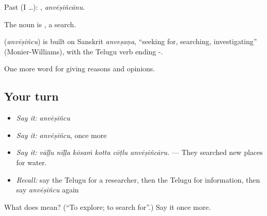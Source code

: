 Past (I …): , \emph{anvēṣiñcānu}.

The noun is , a search.

\begin{cousinweb}
\textbf{} (\emph{anvēṣiñcu}) is built on Sanskrit \emph{anveṣaṇa}, \textquotedblleft{}seeking for, searching, investigating\textquotedblright{} (Monier-Williams), with the Telugu verb ending -.
\end{cousinweb}

\begin{grammarlens}[title={What you've built}]
One more word for giving reasons and opinions.
\end{grammarlens}

\subsection*{Your turn}
\begin{itemize}
\raggedright
  \item \emph{Say it:} \emph{anvēṣiñcu}
  \item \emph{Say it:} \emph{anvēṣiñcu}, once more
  \item \emph{Say it:} \emph{vāḷḷu nīḷḷa kōsaṁ kotta cōṭlu anvēṣiñcāru.} — They searched new places for water.
  \item \emph{Recall:} say the Telugu for a researcher, then the Telugu for information, then say \emph{anvēṣiñcu} again
\end{itemize}

\begin{tcolorbox}[breakable,colback=teal!4,colframe=teal!35!black,title={Before you move on}]
What does  mean? (\textquotedblleft{}To explore; to search for\textquotedblright{}.) Say it once more.
\end{tcolorbox}
